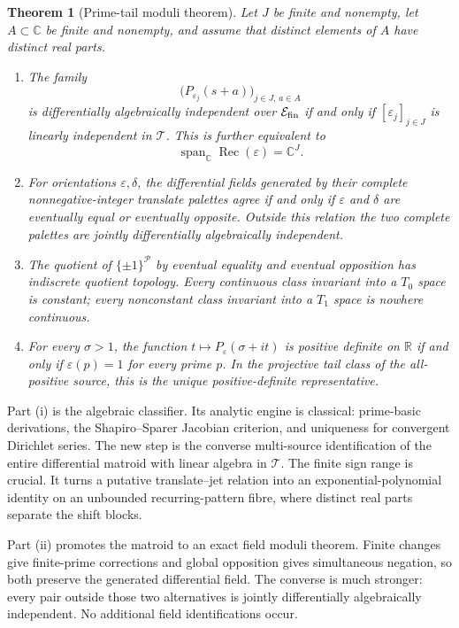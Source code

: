 \documentclass[11pt]{article}
\newtheorem{theorem}{Theorem}[section]
\theoremstyle{definition}
\theoremstyle{remark}
\newcommand{\C}{\mathbb C}
\newcommand{\R}{\mathbb R}
\newcommand{\cP}{\mathcal P}
\newcommand{\cT}{\mathcal T}
\newcommand{\cE}{\mathcal E}
\newcommand{\Span}{\operatorname{span}}
\begin{document}
\begin{theorem}[Prime-tail moduli theorem]\label{thm:intro-main}
Let \(J\) be finite and nonempty, let \(A\subset\C\) be finite and nonempty, and assume
that distinct elements of \(A\) have distinct real parts.
\begin{enumerate}[label=\textup{(\roman*)},leftmargin=2.4em]
  \item The family
  \[
    \bigl(P_{\varepsilon_j}(s+a)\bigr)_{j\in J,\,a\in A}
  \]
  is differentially algebraically independent over \(\cE_{\rm fin}\) if and only if
  \([\varepsilon_j]_{j\in J}\) is linearly independent in \(\cT\).  This is further
  equivalent to
  \[
    \Span_\C\operatorname{Rec}(\varepsilon)=\C^J.
  \]
  \item For orientations \(\varepsilon,\delta\), the differential fields generated by their
  complete nonnegative-integer translate palettes agree if and only if
  \(\varepsilon\) and \(\delta\) are eventually equal or eventually opposite.
  Outside this relation the two complete palettes are jointly differentially algebraically
  independent.
  \item The quotient of \(\{\pm1\}^{\cP}\) by eventual equality and eventual opposition has
  indiscrete quotient topology.  Every continuous class invariant into a \(T_0\) space is
  constant; every nonconstant class invariant into a \(T_1\) space is nowhere continuous.
  \item For every \(\sigma>1\), the function
  \(t\mapsto P_\varepsilon(\sigma+it)\) is positive definite on \(\R\) if and only if
  \(\varepsilon(p)=1\) for every prime \(p\).  In the projective tail class of the
  all-positive source, this is the unique positive-definite representative.
\end{enumerate}
\end{theorem}

Part (i) is the algebraic classifier.  Its analytic engine is classical: prime-basic derivations,
the Shapiro--Sparer Jacobian criterion, and uniqueness for convergent Dirichlet series.  The new
step is the converse multi-source identification of the entire differential matroid with linear
algebra in \(\cT\).  The finite sign range is crucial.  It turns a putative translate--jet
relation into an exponential-polynomial identity on an unbounded recurring-pattern fibre, where
distinct real parts separate the shift blocks.

Part (ii) promotes the matroid to an exact field moduli theorem.  Finite changes give finite-prime
corrections and global opposition gives simultaneous negation, so both preserve the generated
differential field.  The converse is much stronger: every pair outside those two alternatives is
jointly differentially algebraically independent.  No additional field identifications occur.
\end{document}
